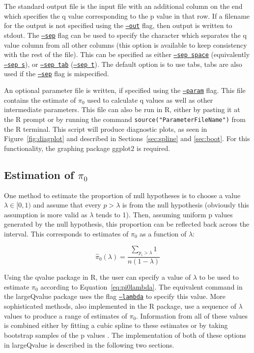 \documentclass{amsart}
\begin{document}
The standard output file is the input file with an additional column on the end which specifies the q value \citep{storeydirect} corresponding to the p value in that row. If a filename for the output is not specified using the \underline{\texttt{--out}} flag, then output is written to stdout. The \underline{\texttt{--sep}} flag can be used to specify the character which separates the q value column from all other columns (this option is available to keep consistency with the rest of the file). This can be specified as either \underline{\texttt{--sep space}} (equivalently \underline{\texttt{--sep s}}), or \underline{\texttt{--sep tab}} (\underline{\texttt{--sep t}}). The default option is to use tabs, tabs are also used if the \underline{\texttt{--sep}} flag is mispecified.

An optional parameter file is written, if specified using the \underline{\texttt{--param}} flag. This file contains the estimate of $\pi_0$ used to calculate q values as well as other intermediate parameters. This file can also be run in R, either by pasting it at the R prompt or by running the command \texttt{source("ParameterFileName")} from the R terminal. This script will produce diagnostic plots, as seen in Figure~\ref{fig:diagplot} and described in Sections~\ref{sec:spline} and \ref{sec:boot}. For this functionality, the graphing package ggplot2 \citep{ggplot} is required.

\subsection{Estimation of $\pi_0$}
\label{sec:pi0}

One method to estimate the proportion of null hypotheses is to choose a value $\lambda\in [0, 1)$ and assume that every $p > \lambda$ is from the null hypothesis (obviously this assumption is more valid as $\lambda$ tends to 1). Then, assuming uniform p values generated by the null hypothesis, this proportion can be reflected back across the interval. This corresponds to estimates of $\pi_0$ as a function of $\lambda$:

\begin{equation}
  \label{eq:pi0lambda}
  \hat{\pi}_0(\lambda) = \frac{\sum_{p_i > \lambda}1}{n(1-\lambda)} 
\end{equation}

Using the qvalue package in R, the user can specify a value of $\lambda$ to be used to estimate $\pi_0$ according to Equation~\ref{eq:pi0lambda}. The equivalent command in the largeQvalue package uses the flag \underline{\texttt{--lambda}} to specify this value. More sophisticated methods, also implemented in the R package, use a sequence of $\lambda$ values to produce a range of estimates of $\pi_0$. Information from all of these values is combined either by fitting a cubic spline to these estimates \citep{splinestorey} or by taking bootstrap samples of the p values \citep{bootstorey}. The implementation of both of these options in largeQvalue is described in the following two sections.
\end{document}
